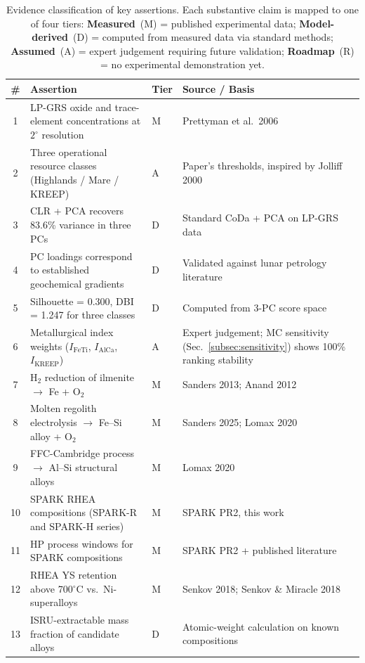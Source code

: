 \documentclass[11pt,a4paper]{article}
\begin{document}
\begin{landscape}
\begin{table}[p]
\vspace{10mm}
\centering
\caption{Evidence classification of key assertions. Each substantive claim is mapped to one of four tiers: \textbf{Measured}~(M) = published experimental data; \textbf{Model-derived}~(D) = computed from measured data via standard methods; \textbf{Assumed}~(A) = expert judgement requiring future validation; \textbf{Roadmap}~(R) = no experimental demonstration yet.}
\label{tab:evidence}
\scriptsize
\begin{tabular}{clll}
\toprule
\textbf{\#} & \textbf{Assertion} & \textbf{Tier} & \textbf{Source / Basis} \\
\midrule
1  & LP-GRS oxide and trace-element concentrations at $2^\circ$ resolution & M & Prettyman et al.\ 2006 \\
2  & Three operational resource classes (Highlands / Mare / KREEP) & A & Paper's thresholds, inspired by Jolliff 2000 \\
3  & CLR + PCA recovers 83.6\% variance in three PCs & D & Standard CoDa + PCA on LP-GRS data \\
4  & PC loadings correspond to established geochemical gradients & D & Validated against lunar petrology literature \\
5  & Silhouette = 0.300, DBI = 1.247 for three classes & D & Computed from 3-PC score space \\
6  & Metallurgical index weights ($I_\text{FeTi}$, $I_\text{AlCa}$, $I_\text{KREEP}$) & A & Expert judgement; MC sensitivity (Sec.~\ref{subsec:sensitivity}) shows 100\% ranking stability \\
7  & H$_2$ reduction of ilmenite $\rightarrow$ Fe + O$_2$ & M & Sanders 2013; Anand 2012 \\
8  & Molten regolith electrolysis $\rightarrow$ Fe--Si alloy + O$_2$ & M & Sanders 2025; Lomax 2020 \\
9  & FFC-Cambridge process $\rightarrow$ Al--Si structural alloys & M & Lomax 2020 \\
10 & SPARK RHEA compositions (SPARK-R and SPARK-H series) & M & SPARK PR2, this work \\
11 & HP process windows for SPARK compositions & M & SPARK PR2 + published literature \\
12 & RHEA YS retention above 700$^\circ$C vs.\ Ni-superalloys & M & Senkov 2018; Senkov \& Miracle 2018 \\
13 & ISRU-extractable mass fraction of candidate alloys & D & Atomic-weight calculation on known compositions \\

\end{tabular}
\end{table}
\end{landscape}
\end{document}
